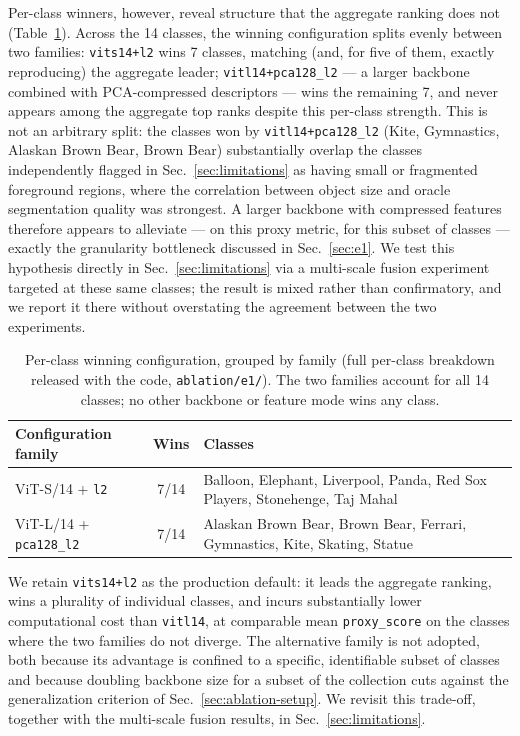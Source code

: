 Per-class winners, however, reveal structure that the aggregate ranking
does not (Table~\ref{tab:e1-best-by-class-summary}). Across the 14
classes, the winning configuration splits evenly between two families:
\texttt{vits14+l2} wins 7 classes, matching (and, for five of them,
exactly reproducing) the aggregate leader; \texttt{vitl14+pca128\_l2} ---
a larger backbone combined with PCA-compressed descriptors --- wins the
remaining 7, and never appears among the aggregate top ranks despite
this per-class strength. This is not an arbitrary split: the classes won
by \texttt{vitl14+pca128\_l2} (Kite, Gymnastics, Alaskan Brown Bear,
Brown Bear) substantially overlap the classes independently flagged in
Sec.~\ref{sec:limitations} as having small or fragmented foreground
regions, where the correlation between object size and oracle
segmentation quality was strongest. A larger backbone with compressed
features therefore appears to alleviate --- on this proxy metric, for
this subset of classes --- exactly the granularity bottleneck discussed
in Sec.~\ref{sec:e1}. We test this hypothesis directly in
Sec.~\ref{sec:limitations} via a multi-scale fusion experiment targeted
at these same classes; the result is mixed rather than confirmatory, and
we report it there without overstating the agreement between the two
experiments.
 
\begin{table}[t]
\centering
\caption{Per-class winning configuration, grouped by family (full
per-class breakdown released with the code, \texttt{ablation/e1/}).
The two families account for all 14 classes; no other backbone or
feature mode wins any class.}
\label{tab:e1-best-by-class-summary}
\begin{tabular}{@{}lcp{4.5cm}@{}}
\toprule
\textbf{Configuration family} & \textbf{Wins} & \textbf{Classes} \\
\midrule
ViT-S/14 + \texttt{l2} &
7/14 &
Balloon, Elephant, Liverpool, Panda, Red Sox Players, Stonehenge, Taj Mahal \\
\addlinespace
ViT-L/14 + \texttt{pca128\_l2} &
7/14 &
Alaskan Brown Bear, Brown Bear, Ferrari, Gymnastics, Kite, Skating, Statue \\
\bottomrule
\end{tabular}
\end{table}
 
We retain \texttt{vits14+l2} as the production default: it leads the
aggregate ranking, wins a plurality of individual classes, and incurs
substantially lower computational cost than \texttt{vitl14}, at
comparable mean \texttt{proxy\_score} on the classes where the two
families do not diverge. The alternative family is not adopted, both
because its advantage is confined to a specific, identifiable subset of
classes and because doubling backbone size for a subset of the
collection cuts against the generalization criterion of
Sec.~\ref{sec:ablation-setup}. We revisit this trade-off, together with
the multi-scale fusion results, in Sec.~\ref{sec:limitations}.

